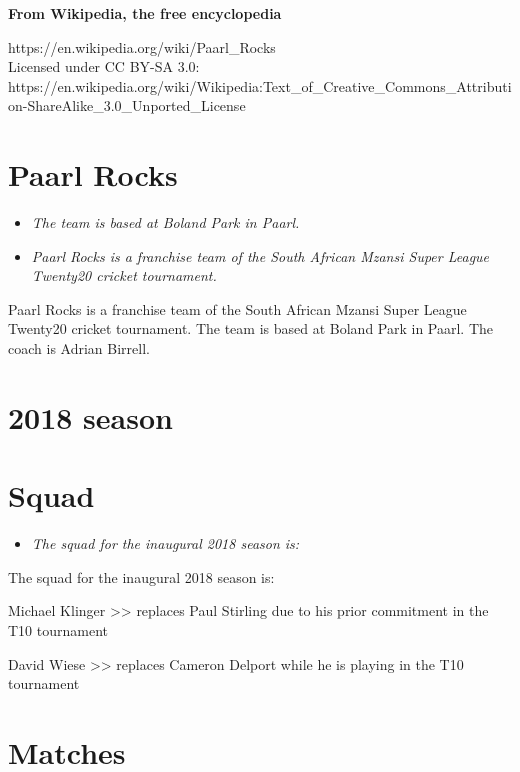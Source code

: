 \textbf{From Wikipedia, the free encyclopedia}

https://en.wikipedia.org/wiki/Paarl\_Rocks\\
Licensed under CC BY-SA 3.0:\\
https://en.wikipedia.org/wiki/Wikipedia:Text\_of\_Creative\_Commons\_Attribution-ShareAlike\_3.0\_Unported\_License

\section{Paarl Rocks}\label{paarl-rocks}

\begin{itemize}
\item
  \emph{The team is based at Boland Park in Paarl.}
\item
  \emph{Paarl Rocks is a franchise team of the South African Mzansi
  Super League Twenty20 cricket tournament.}
\end{itemize}

Paarl Rocks is a franchise team of the South African Mzansi Super League
Twenty20 cricket tournament. The team is based at Boland Park in Paarl.
The coach is Adrian Birrell.

\section{2018 season}\label{season}

\section{Squad}\label{squad}

\begin{itemize}
\item
  \emph{The squad for the inaugural 2018 season is:}
\end{itemize}

The squad for the inaugural 2018 season is:

Michael Klinger \textgreater{}\textgreater{} replaces Paul Stirling due
to his prior commitment in the T10 tournament

David Wiese \textgreater{}\textgreater{} replaces Cameron Delport while
he is playing in the T10 tournament

\section{Matches}\label{matches}

